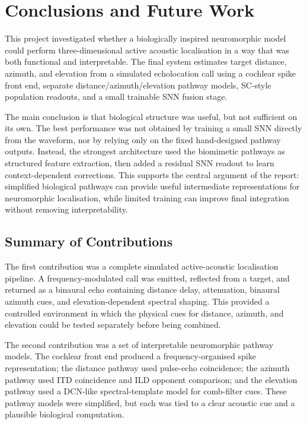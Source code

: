 \chapter{Conclusions and Future Work} \label{ch:conclusions}

This project investigated whether a biologically inspired neuromorphic model could perform three-dimensional active acoustic localisation in a way that was both functional and interpretable. The final system estimates target distance, azimuth, and elevation from a simulated echolocation call using a cochlear spike front end, separate distance/azimuth/elevation pathway models, SC-style population readouts, and a small trainable SNN fusion stage.

The main conclusion is that biological structure was useful, but not sufficient on its own. The best performance was not obtained by training a small SNN directly from the waveform, nor by relying only on the fixed hand-designed pathway outputs. Instead, the strongest architecture used the biomimetic pathways as structured feature extraction, then added a residual SNN readout to learn context-dependent corrections. This supports the central argument of the report: simplified biological pathways can provide useful intermediate representations for neuromorphic localisation, while limited training can improve final integration without removing interpretability.

\section{Summary of Contributions}

The first contribution was a complete simulated active-acoustic localisation pipeline. A frequency-modulated call was emitted, reflected from a target, and returned as a binaural echo containing distance delay, attenuation, binaural azimuth cues, and elevation-dependent spectral shaping. This provided a controlled environment in which the physical cues for distance, azimuth, and elevation could be tested separately before being combined.

The second contribution was a set of interpretable neuromorphic pathway models. The cochlear front end produced a frequency-organised spike representation; the distance pathway used pulse-echo coincidence; the azimuth pathway used ITD coincidence and ILD opponent comparison; and the elevation pathway used a DCN-like spectral-template model for comb-filter cues. These pathway models were simplified, but each was tied to a clear acoustic cue and a plausible biological computation.

